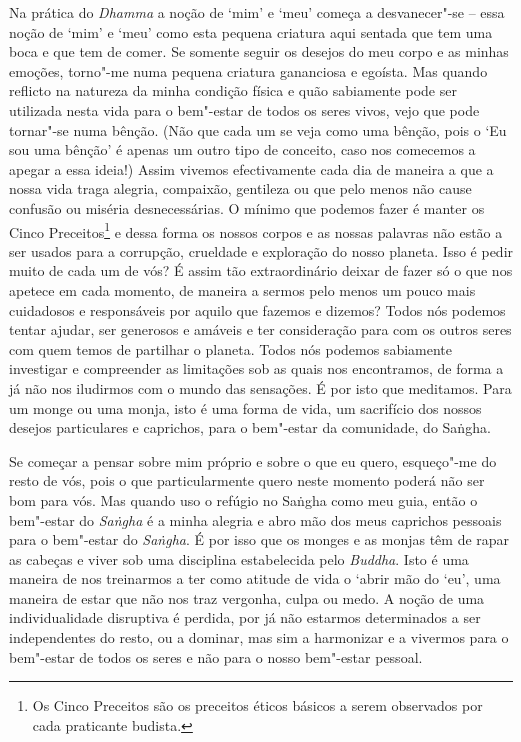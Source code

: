 Na prática do \emph{Dhamma} a noção de `mim' e `meu' começa a
desvanecer"-se -- essa noção de `mim' e `meu' como esta pequena criatura
aqui sentada que tem uma boca e que tem de comer. Se somente seguir os
desejos do meu corpo e as minhas emoções, torno"-me numa pequena criatura
gananciosa e egoísta. Mas quando reflicto na natureza da minha condição
física e quão sabiamente pode ser utilizada nesta vida para o bem"-estar
de todos os seres vivos, vejo que pode tornar"-se numa bênção. (Não que
cada um se veja como uma bênção, pois o `Eu sou uma bênção' é apenas um
outro tipo de conceito, caso nos comecemos a apegar a essa ideia!) Assim
vivemos efectivamente cada dia de maneira a que a nossa vida traga
alegria, compaixão, gentileza ou que pelo menos não cause confusão
ou miséria desnecessárias. O mínimo que podemos fazer é manter os Cinco
Preceitos\footnote{%
  Os Cinco Preceitos são os preceitos éticos básicos a serem observados
  por cada praticante budista.}
e dessa forma os nossos corpos e as nossas palavras não estão
a ser usados para a corrupção, crueldade e exploração do nosso planeta.
Isso é pedir muito de cada um de vós? É assim tão extraordinário deixar
de fazer só o que nos apetece em cada momento, de maneira a sermos pelo
menos um pouco mais cuidadosos e responsáveis por aquilo que fazemos e
dizemos? Todos nós podemos tentar ajudar, ser generosos e amáveis e ter
consideração para com os outros seres com quem temos de partilhar o
planeta. Todos nós podemos sabiamente investigar e compreender as
limitações sob as quais nos encontramos, de forma a já não nos iludirmos
com o mundo das sensações. É por isto que meditamos. Para um monge ou
uma monja, isto é uma forma de vida, um sacrifício dos nossos desejos
particulares e caprichos, para o bem"-estar da comunidade, do Saṅgha.

Se começar a pensar sobre mim próprio e sobre o que eu quero, esqueço"-me
do resto de vós, pois o que particularmente quero neste momento poderá
não ser bom para vós. Mas quando uso o refúgio no Saṅgha como meu guia,
então o bem"-estar do \emph{Saṅgha} é a minha alegria e abro mão dos meus
caprichos
pessoais para o bem"-estar do \emph{Saṅgha}. É por isso que os monges e
as monjas têm de rapar as cabeças e viver sob uma disciplina
estabelecida pelo \emph{Buddha}. Isto é uma maneira de nos treinarmos a
ter como atitude de vida o `abrir mão do `eu', uma maneira de estar que
não nos traz vergonha, culpa ou medo. A noção de uma individualidade
disruptiva é perdida, por já não estarmos determinados a ser
independentes do resto, ou a dominar, mas sim a harmonizar e a vivermos
para o bem"-estar de todos os seres e não para o nosso bem"-estar pessoal.

